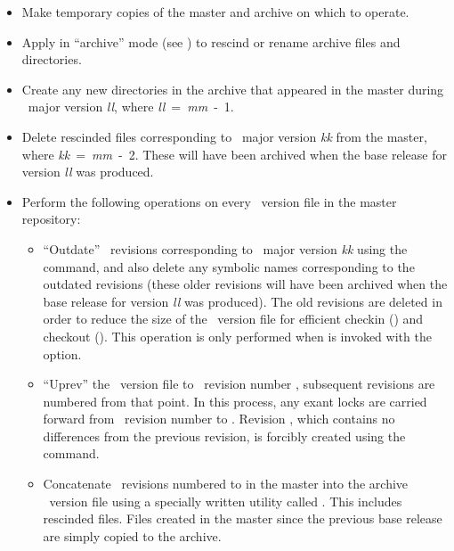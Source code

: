 \begin{itemize}
\item
   Make temporary copies of the master and archive on which to operate.

\item
   Apply  in ``archive'' mode (see ) to
   rescind or rename archive files and directories.

\item
   Create any new directories in the archive that appeared in the master
   during \aipspp\ major version \textit{ll}, where
   \textit{ll}~=~\textit{mm}~-~1.

\item
   Delete rescinded files corresponding to \aipspp\ major version \textit{kk}
   from the master, where \textit{kk}~=~\textit{mm}~-~2.  These will have
   been archived when the base release for version \textit{ll} was produced.

\item
   Perform the following operations on every \rcs\ version file in the master
   repository:

   \begin{itemize}
   \item
      ``Outdate'' \rcs\ revisions corresponding to \aipspp\ major version
      \textit{kk} using the  command, and also delete any symbolic
      names corresponding to the outdated revisions (these older revisions
      will have been archived when the base release for version \textit{ll}
      was produced).  The old revisions are deleted in order to reduce the
      size of the \rcs\ version file for efficient checkin () and
      checkout ().  This operation is only performed when
       is invoked with the  option.

   \item
      ``Uprev'' the \rcs\ version file to \rcs\ revision number
      , subsequent revisions are numbered from that point.
      In this process, any exant locks are carried forward from \rcs\ revision
      number  to .  Revision
      , which contains no differences from the previous
      revision, is forcibly created using the  command.

   \item
      Concatenate \rcs\ revisions numbered  to
       in the master into the archive \rcs\ version file
      using a specially written utility called .  This includes
      rescinded files.  Files created in the master since the previous base
      release are simply copied to the archive.
   \end{itemize}


\end{itemize}

